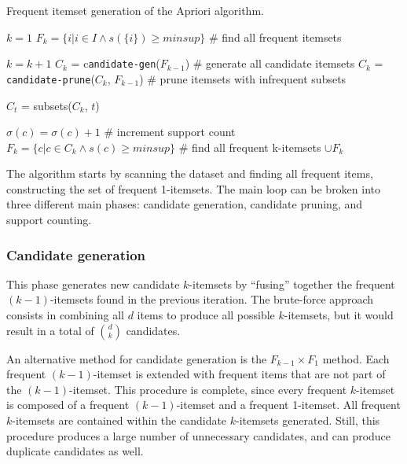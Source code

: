 \begin{algorithm}
\caption{Frequent itemset generation of the Apriori algorithm.}
\begin{algorithmic}[1]
    \State $k = 1$
    \State $F_k = \{ i | i \in I \land s(\{i\}) \geq minsup \}$ \# find all frequent itemsets

    \Repeat
        \State $k = k + 1$
        \State $C_k$ = c\texttt{andidate-gen}($F_{k-1}$) \# generate all candidate itemsets
        \State $C_k$ = \texttt{candidate-prune}($C_k$, $F_{k-1}$) \# prune itemsets with infrequent subsets

            \State $C_t$ = subsets($C_k$, $t$)

                \State $\sigma(c) = \sigma(c) + 1$ \# increment support count
            \EndFor
        \EndFor
        \State $F_k = \{ c | c \in C_k \land s(c) \geq minsup \}$ \# find all frequent k-itemsets
    \State \Return $\cup F_k$
\end{algorithmic}
\end{algorithm}

The algorithm starts by scanning the dataset and finding all frequent items, constructing the set of frequent 1-itemsets. The main loop can be broken into three different main phases: candidate generation, candidate pruning, and support counting.

\subsubsection{Candidate generation}

This phase generates new candidate $k$-itemsets by ``fusing'' together the frequent $(k-1)$-itemsets found in the previous iteration. The brute-force approach consists in combining all $d$ items to produce all possible $k$-itemsets, but it would result in a total of $\binom{d}{k}$ candidates.

An alternative method for candidate generation is the $F_{k-1} \times F_1$ method. Each frequent $(k-1)$-itemset is extended with frequent items that are not part of the $(k-1)$-itemset. This procedure is complete, since every frequent $k$-itemset is composed of a frequent $(k-1)$-itemset and a frequent 1-itemset. All frequent $k$-itemsets are contained within the candidate $k$-itemsets generated. Still, this procedure produces a large number of unnecessary candidates, and can produce duplicate candidates as well.

